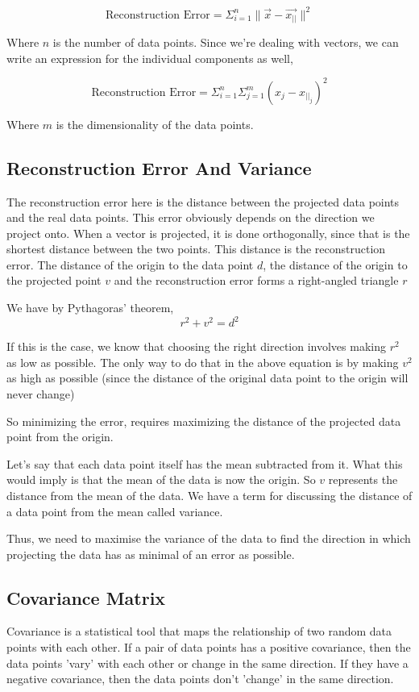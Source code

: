 \documentclass[conference]{IEEEtran}
\begin{document}
$$\text{Reconstruction Error} = \Sigma_{i = 1}^{n} \| \vec{x} - \vec{x_{||}} \|^{2}$$

Where \(n\) is the number of data points. Since we're dealing with vectors, we can write an expression for the individual components as well,

$$\text{Reconstruction Error} = \Sigma_{i = 1}^{n} \Sigma_{j=1}^{m}(x_{j} - x_{||_{j}})^{2}$$

Where \(m\) is the dimensionality of the data points.
\subsection{Reconstruction Error And Variance}

The reconstruction error here is the distance between the projected data points and the real data points. This error obviously depends on the direction we project onto. When a vector is projected, it is done orthogonally, since that is the shortest distance between the two points. This distance is the reconstruction error. The distance of the origin to the data point $d$, the distance of the origin to the projected point $v$ and the reconstruction error forms a right-angled triangle $r$

We have by Pythagoras' theorem,
$$r^2 + v^2 = d^2$$

If this is the case, we know that choosing the right direction involves making $r^2$ as low as possible. The only way to do that in the above equation is by making $v^2$ as high as possible (since the distance of the original data point to the origin will never change)

So minimizing the error, requires maximizing the distance of the projected data point from the origin.

Let's say that each data point itself has the mean subtracted from it. What this would imply is that the mean of the data is now the origin. So $v$ represents the distance from the mean of the data. We have a term for discussing the distance of a data point from the mean called variance.

Thus, we need to maximise the variance of the data to find the direction in which projecting the data has as minimal of an error as possible.

\subsection{Covariance Matrix}
Covariance is a statistical tool that maps the relationship of two random data points with each other. If a pair of data points has a positive covariance, then the data points 'vary' with each other or change in the same direction. If they have a negative covariance, then the data points don't 'change' in the same direction.
\end{document}
